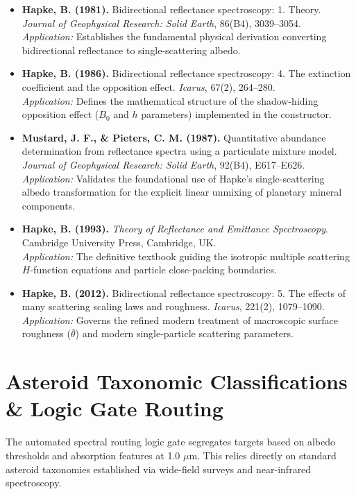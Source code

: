 \documentclass[11pt,letterpaper]{article}
\begin{document}
\begin{itemize}
    \item \textbf{Hapke, B. (1981).} Bidirectional reflectance spectroscopy: 1. Theory. \textit{Journal of Geophysical Research: Solid Earth}, 86(B4), 3039--3054. \\
    \textit{Application:} Establishes the fundamental physical derivation converting bidirectional reflectance to single-scattering albedo.
    
    \item \textbf{Hapke, B. (1986).} Bidirectional reflectance spectroscopy: 4. The extinction coefficient and the opposition effect. \textit{Icarus}, 67(2), 264--280. \\
    \textit{Application:} Defines the mathematical structure of the shadow-hiding opposition effect ($B_0$ and $h$ parameters) implemented in the constructor.
    
    \item \textbf{Mustard, J. F., \& Pieters, C. M. (1987).} Quantitative abundance determination from reflectance spectra using a particulate mixture model. \textit{Journal of Geophysical Research: Solid Earth}, 92(B4), E617--E626. \\
    \textit{Application:} Validates the foundational use of Hapke's single-scattering albedo transformation for the explicit linear unmixing of planetary mineral components.
    
    \item \textbf{Hapke, B. (1993).} \textit{Theory of Reflectance and Emittance Spectroscopy}. Cambridge University Press, Cambridge, UK. \\
    \textit{Application:} The definitive textbook guiding the isotropic multiple scattering $H$-function equations and particle close-packing boundaries.
    
    \item \textbf{Hapke, B. (2012).} Bidirectional reflectance spectroscopy: 5. The effects of many scattering scaling laws and roughness. \textit{Icarus}, 221(2), 1079--1090. \\
    \textit{Application:} Governs the refined modern treatment of macroscopic surface roughness ($\bar{\theta}$) and modern single-particle scattering parameters.
\end{itemize}

\section{Asteroid Taxonomic Classifications \& Logic Gate Routing}
The automated spectral routing logic gate segregates targets based on albedo thresholds and absorption features at 1.0 $\mu$m. This relies directly on standard asteroid taxonomies established via wide-field surveys and near-infrared spectroscopy.
\end{document}

